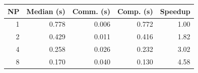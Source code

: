 \begin{tabular}{rrrrr}
  \toprule
  NP & Median (s) & Comm. (s) & Comp. (s) & Speedup \\
  \midrule
  1 & 0.778 & 0.006 & 0.772 & 1.00 \\
  2 & 0.429 & 0.011 & 0.416 & 1.82 \\
  4 & 0.258 & 0.026 & 0.232 & 3.02 \\
  8 & 0.170 & 0.040 & 0.130 & 4.58 \\
  \bottomrule
\end{tabular}
